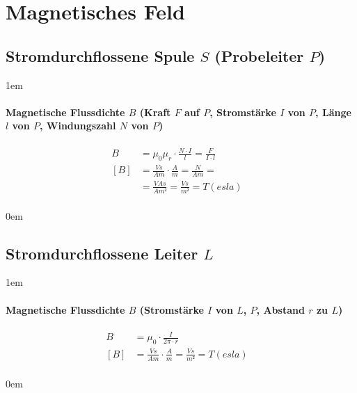 \section{Magnetisches Feld}

\subsection{Stromdurchflossene Spule $S$ (Probeleiter $P$)}

\leftskip1em
\paragraph{Magnetische Flussdichte $B$ (Kraft $F$ auf $P$, Stromstärke $I$ von $P$, Länge $l$ von
$P$, Windungszahl $N$ von $P$)}

\begin{align*}
  B &= \mu_0 \mu_r \cdot \frac{N \cdot I}{l} = \frac{F}{I \cdot l} \\
  [B] &= \frac{Vs}{Am} \cdot \frac{A}{m} = \frac{N}{Am} = \\
  &= \frac{VAs}{Am²} = \frac{Vs}{m²} = T(esla) &\\
\end{align*}

\leftskip0em

\subsection{Stromdurchflossene Leiter $L$}

\leftskip1em
\paragraph{Magnetische Flussdichte $B$ (Stromstärke $I$ von $L$, $P$, Abstand $r$ zu $L$)}

\begin{align*}
  B &= \mu_0 \cdot \frac{I}{2 \pi \cdot r} &\\
  [B] &= \frac{Vs}{Am} \cdot \frac{A}{m} = \frac{Vs}{m²} = T(esla) &\\
\end{align*}

\leftskip0em
